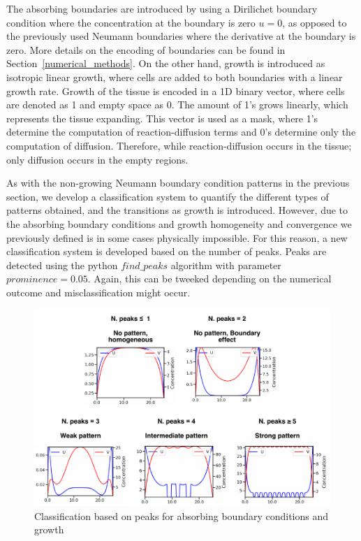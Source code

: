 The absorbing boundaries are introduced by using a Dirilichet boundary condition where the concentration at the boundary is zero $u=0$, as opposed to the previously used Neumann boundaries where the derivative at the boundary is zero.
More details on the encoding of boundaries can be found in Section~\ref{numerical_methods}.
On the other hand, growth is introduced as isotropic linear growth, where cells are added to both boundaries with a linear growth rate.
Growth of the tissue is encoded in a 1D binary vector, where cells are denoted as 1 and empty space as 0.
The amount of 1's grows linearly, which represents the tissue expanding.
This vector is used as a mask, where 1's determine the computation of reaction-diffusion terms and 0's determine only the computation of diffusion.
Therefore, while reaction-diffusion occurs in the tissue; only diffusion occurs in the empty regions.

As with the non-growing Neumann boundary condition patterns in the previous section, we develop a classification system to quantify the different types of patterns obtained, and the transitions as growth is introduced.
However, due to the absorbing boundary conditions and growth homogeneity and convergence we previously defined is in some cases physically impossible.
For this reason, a new classification system is developed based on the number of peaks.
Peaks are detected using the python $find\_peaks$ algorithm with parameter $prominence=0.05$.
Again, this can be tweeked depending on the numerical outcome and misclassification might occur.


\begin{figure}[H] %
    \centering
    \begin{adjustbox}{center}
        \includegraphics[width=1\textwidth]{chapters/Chapter 1/peaks_classification} %
    \end{adjustbox}
    \caption{Classification based on peaks for absorbing boundary conditions and growth}
    \label{fig:peaks_classification} %
\end{figure}

